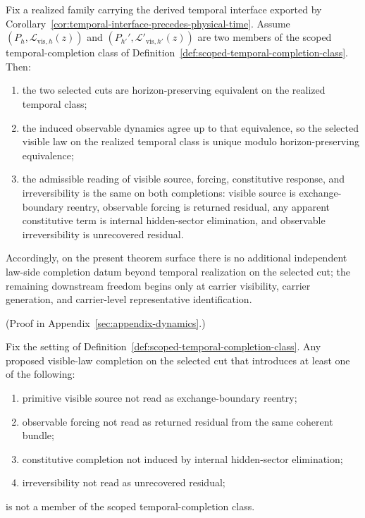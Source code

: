 \begin{proposition}
\label{prop:scoped-temporal-completion-unique}
Fix a realized family carrying the derived temporal interface exported by
Corollary~\ref{cor:temporal-interface-precedes-physical-time}. Assume
\((P_h,\mathcal L_{\mathrm{vis},h}(z))\) and
\((P_{h'}',\mathcal L'_{\mathrm{vis},h'}(z))\) are two members of the scoped
temporal-completion class of
Definition~\ref{def:scoped-temporal-completion-class}. Then:
\begin{enumerate}[label=(\roman*), leftmargin=2em, itemsep=0.2em]
\item the two selected cuts are horizon-preserving equivalent on the realized
      temporal class;
\item the induced observable dynamics agree up to that equivalence, so the
      selected visible law on the realized temporal class is unique modulo
      horizon-preserving equivalence;
\item the admissible reading of visible source, forcing, constitutive response,
      and irreversibility is the same on both completions: visible source is
      exchange-boundary reentry, observable forcing is returned residual, any
      apparent constitutive term is internal hidden-sector elimination, and
      observable irreversibility is unrecovered residual.
\end{enumerate}
Accordingly, on the present theorem surface there is no additional independent
law-side completion datum beyond temporal realization on the selected cut; the
remaining downstream freedom begins only at carrier visibility, carrier
generation, and carrier-level representative identification.
\end{proposition}

(Proof in Appendix~\ref{sec:appendix-dynamics}.)

\begin{corollary}
\label{cor:exogenous-law-side-alternatives-excluded}
Fix the setting of
Definition~\ref{def:scoped-temporal-completion-class}. Any proposed visible-law
completion on the selected cut that introduces at least one of the following:
\begin{enumerate}[label=(\roman*), leftmargin=2em, itemsep=0.2em]
\item primitive visible source not read as exchange-boundary reentry;
\item observable forcing not read as returned residual from the same coherent
      bundle;
\item constitutive completion not induced by internal hidden-sector
      elimination;
\item irreversibility not read as unrecovered residual;
\end{enumerate}
is not a member of the scoped temporal-completion class.
\end{corollary}

